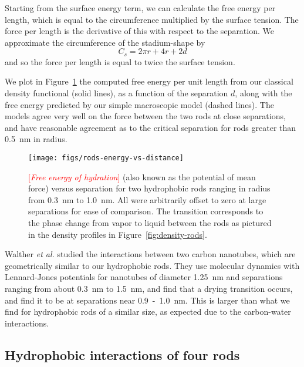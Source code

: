\documentclass[letterpaper,twocolumn,amsmath,amssymb,prb]{revtex4-1}
\newcommand{\fixme}[1]{\textcolor{red}{[\emph{#1}]}}
\begin{document}
Starting from the surface energy term, we can calculate the 
free energy per length, which is equal to the circumference multiplied 
by the surface tension. The force per length is the derivative of this
with respect to the separation. 
We approximate the circumference of the stadium-shape by
\begin{equation}
C_{s} = 2\pi r +4r+2d
\end{equation}
and so the force per length is equal to twice the surface tension.

We plot in Figure~\ref{fig:rods-energy-vs-distance} the computed free energy
per unit length from our classical density functional (solid lines),
as a function of the separation $d$, along with the free energy
predicted by our simple macroscopic model (dashed lines).  The models
agree very well on the force between the two rods at close
separations, and have reasonable agreement as to the critical
separation for rods greater than 0.5~nm in radius.

\begin{figure}
\begin{center}
\texttt{[image: figs/rods-energy-vs-distance]}
\end{center}
\caption{ \fixme{Free energy of hydration} (also known as the potential of mean force) 
versus separation for two hydrophobic rods ranging in radius from
0.3~nm to 1.0~nm.
All were arbitrarily offset to zero at large separations for ease of comparison. The
transition corresponds to the phase change from
vapor to liquid between the rods as pictured in the density profiles in 
Figure~\ref{fig:density-rods}. }
\label{fig:rods-energy-vs-distance}
\end{figure}

Walther \emph{et al.}\cite{walther2004hydrodynamic} studied the
interactions between two carbon nanotubes, which are geometrically
similar to our hydrophobic rods.  They use molecular dynamics with
Lennard-Jones potentials for nanotubes of diameter 1.25~nm and
separations ranging from about 0.3~nm to 1.5~nm, and find that a
drying transition occurs, and find it to be at separations near
0.9~-~1.0~nm\cite{walther2004hydrodynamic}. This is larger than what
we find for hydrophobic rods of a similar size, as expected due to the
carbon-water interactions.

\subsection{Hydrophobic interactions of four rods}
\end{document}
